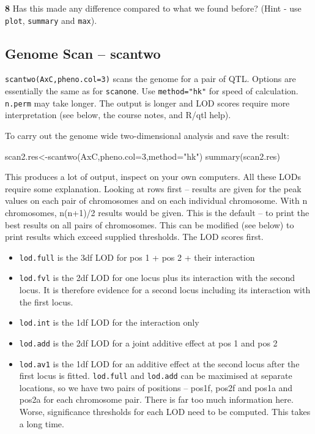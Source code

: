 \documentclass[
]{book}
\makeatletter
\newenvironment{Shaded}{\begin{snugshade}}{\end{snugshade}}
\newcommand{\AttributeTok}[1]{\textcolor[rgb]{0.77,0.63,0.00}{#1}}
\newcommand{\DecValTok}[1]{\textcolor[rgb]{0.00,0.00,0.81}{#1}}
\newcommand{\FunctionTok}[1]{\textcolor[rgb]{0.00,0.00,0.00}{#1}}
\newcommand{\NormalTok}[1]{#1}
\newcommand{\OtherTok}[1]{\textcolor[rgb]{0.56,0.35,0.01}{#1}}
\newcommand{\StringTok}[1]{\textcolor[rgb]{0.31,0.60,0.02}{#1}}
\providecommand{\tightlist}{%
  \setlength{\itemsep}{0pt}\setlength{\parskip}{0pt}}
\newenvironment{kframe}{%
\medskip{}
\setlength{\fboxsep}{.8em}
 \def\at@end@of@kframe{}%
 \ifinner\ifhmode%
  \def\at@end@of@kframe{\end{minipage}}%
  \begin{minipage}{\columnwidth}%
 \fi\fi%
 \def\FrameCommand##1{\hskip\@totalleftmargin \hskip-\fboxsep
 \colorbox{shadecolor}{##1}\hskip-\fboxsep
     \hskip-\linewidth \hskip-\@totalleftmargin \hskip\columnwidth}%
 \MakeFramed {\advance\hsize-\width
   \@totalleftmargin\z@ \linewidth\hsize
   \@setminipage}}%
 {\par\unskip\endMakeFramed%
 \at@end@of@kframe}
\newenvironment{rmdblock}[1]
  {
  \begin{itemize}
  \renewcommand{\labelitemi}{
    \raisebox{-.7\height}[0pt][0pt]{
      {\setkeys{Gin}{width=3em,keepaspectratio}\texttt{[image: images/\#1]}}
    }
  }
  \setlength{\fboxsep}{1em}
  \begin{kframe}
  \item
  }
  {
  \end{kframe}
  \end{itemize}
  }
\newenvironment{rmdquiz}
  {\begin{rmdblock}{quiz}}
  {\end{rmdblock}}
\makeatother
\begin{document}
\begin{rmdquiz}
\textbf{8}
Has this made any difference compared to what we found before? (Hint - use \texttt{plot}, \texttt{summary} and \texttt{max}).\\
\end{rmdquiz}

\hypertarget{genome-scan-scantwo}{%
\subsection{Genome Scan -- scantwo}\label{genome-scan-scantwo}}

\texttt{scantwo(AxC,pheno.col=3)} scans the genome for a pair of QTL. Options are essentially the same as for \texttt{scanone}. Use \texttt{method="hk"} for speed of calculation. \texttt{n.perm} may take longer. The output is longer and LOD scores require more interpretation (see below, the course notes, and R/qtl help).

To carry out the genome wide two-dimensional analysis and save the result:

\begin{Shaded}
\begin{Highlighting}[]
\NormalTok{scan2.res}\OtherTok{\textless{}{-}}\FunctionTok{scantwo}\NormalTok{(AxC,}\AttributeTok{pheno.col=}\DecValTok{3}\NormalTok{,}\AttributeTok{method=}\StringTok{"hk"}\NormalTok{)  }
\FunctionTok{summary}\NormalTok{(scan2.res) }
\end{Highlighting}
\end{Shaded}

This produces a lot of output, inspect on your own computers. All these LODs require some explanation.
Looking at rows first -- results are given for the peak values on each pair of chromosomes and on each individual chromosome. With n chromosomes, n(n+1)/2 results would be given. This is the default -- to print the best results on all pairs of chromosomes. This can be modified (see below) to print results which exceed supplied thresholds. The LOD scores first.

\begin{itemize}
\tightlist
\item
  \texttt{lod.full} is the 3df LOD for pos 1 + pos 2 + their interaction
\item
  \texttt{lod.fvl} is the 2df LOD for one locus plus its interaction with the second locus. It is therefore evidence for a second locus including its interaction with the first locus.
\item
  \texttt{lod.int} is the 1df LOD for the interaction only
\item
  \texttt{lod.add} is the 2df LOD for a joint additive effect at pos 1 and pos 2
\item
  \texttt{lod.av1} is the 1df LOD for an additive effect at the second locus after the first locus is fitted.
  \texttt{lod.full} and \texttt{lod.add} can be maximised at separate locations, so we have two pairs of positions -- pos1f, pos2f and pos1a and pos2a for each chromosome pair. There is far too much information here. Worse, significance thresholds for each LOD need to be computed. This takes a long time.
\end{itemize}
\end{document}
